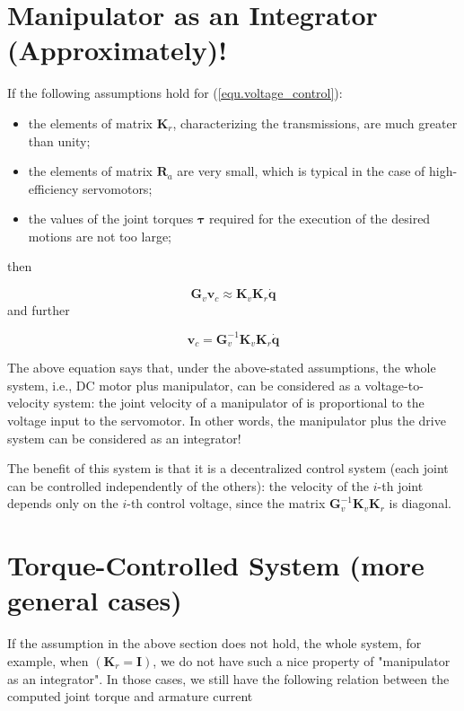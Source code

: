 \documentclass[10pt]{article}
\begin{document}
\section{Manipulator as an  Integrator (Approximately)!}

If the following assumptions hold for (\ref{equ.voltage_control}):

\begin{itemize}
  \item the elements of matrix $\boldsymbol{K}_{r}$, characterizing the transmissions, are much greater than unity;

  \item the elements of matrix $\boldsymbol{R}_{a}$ are very small, which is typical in the case of high-efficiency servomotors;

  \item the values of the joint torques $\boldsymbol{\tau}$ required for the execution of the desired motions are not too large;

\end{itemize}

then 

$$
\boldsymbol{G}_{v} \boldsymbol{v}_{c} \approx \boldsymbol{K}_{v} \boldsymbol{K}_{r} \dot{\boldsymbol{q}}
$$
and further 

\begin{equation}
    \boldsymbol{v}_{c} = \boldsymbol{G}_{v}^{-1} \boldsymbol{K}_{v} \boldsymbol{K}_{r} \dot{\boldsymbol{q}}
\end{equation}

The above equation says that, under the above-stated assumptions,  the whole system, i.e., DC motor plus manipulator, can be considered as a voltage-to-velocity system:  the joint velocity of a manipulator of is proportional to the voltage input to the servomotor. In other words, the manipulator plus the drive system can be considered as an integrator! 



The benefit of this system is that it is a decentralized control system (each joint can be controlled independently of the others): the velocity of the $i$-th joint depends only on the $i$-th control voltage, since the matrix $\boldsymbol{G}_{v}^{-1} \boldsymbol{K}_{v} \boldsymbol{K}_{r}$ is diagonal.  




\section{Torque-Controlled System (more general cases)}
If the assumption in the above section does not hold, the whole system, for example, when $\left(\boldsymbol{K}_{r}=\boldsymbol{I}\right)$, we do not have such a nice property of "manipulator as an integrator". In those cases,  we still have the following relation between the computed joint torque and armature current
\end{document}
